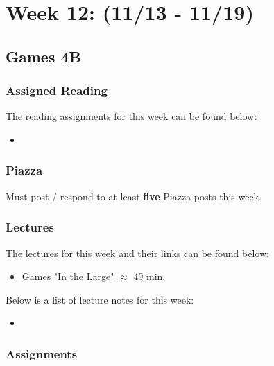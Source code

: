 \clearpage
\chapter{Week 12: (11/13 - 11/19)}

\section{Games 4B}

\subsection{Assigned Reading}

The reading assignments for this week can be found below:

\begin{itemize}
    \item {}
\end{itemize}

\subsection{Piazza}

Must post / respond to at least \textbf{five} Piazza posts this week.  

\subsection{Lectures}

The lectures for this week and their links can be found below:

\begin{itemize}
    \item \href{https://applied.cs.colorado.edu/mod/hvp/view.php?id=49420}{Games "In the Large"} $\approx$ 49 min.
\end{itemize}

\noindent Below is a list of lecture notes for this week:

\begin{itemize}
    \item {}
\end{itemize}

\subsection{Assignments}

